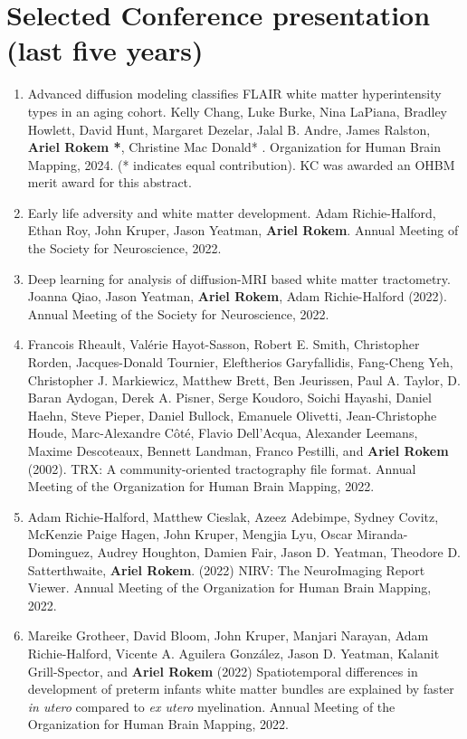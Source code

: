 \documentclass[11pt,fullpage]{article}
\begin{document}
\section*{Selected Conference presentation (last five years)}
\begin{enumerate}

\item Advanced diffusion modeling classifies FLAIR white matter hyperintensity types in an aging cohort. Kelly Chang, Luke Burke, Nina LaPiana, Bradley Howlett, David Hunt, Margaret
Dezelar, Jalal B. Andre, James Ralston, {\bf Ariel Rokem *}, Christine Mac Donald* . Organization for Human Brain Mapping, 2024. (* indicates equal contribution). KC was awarded an OHBM merit award for this abstract.

\item Early life adversity and white matter development. Adam Richie-Halford, Ethan Roy, John Kruper, Jason Yeatman, {\bf Ariel Rokem}. Annual Meeting of the Society for Neuroscience, 2022.

\item Deep learning for analysis of diffusion-MRI based white matter tractometry. Joanna Qiao, Jason Yeatman, {\bf Ariel Rokem}, Adam Richie-Halford (2022). Annual Meeting of the Society for Neuroscience, 2022.

\item Francois Rheault, Val\'{e}rie Hayot-Sasson, Robert E. Smith, Christopher Rorden, Jacques-Donald Tournier, Eleftherios Garyfallidis, Fang-Cheng Yeh, Christopher J. Markiewicz, Matthew Brett, Ben Jeurissen, Paul A. Taylor, D. Baran Aydogan, Derek A. Pisner, Serge Koudoro, Soichi Hayashi, Daniel Haehn, Steve Pieper, Daniel Bullock, Emanuele Olivetti, Jean-Christophe Houde, Marc-Alexandre C\^{o}t\'{e}, Flavio Dell’Acqua, Alexander Leemans, Maxime Descoteaux, Bennett Landman, Franco Pestilli, and {\bf Ariel Rokem} (2002). TRX: A community-oriented tractography file format. Annual Meeting of the Organization for Human Brain Mapping, 2022.

\item Adam Richie-Halford, Matthew Cieslak, Azeez Adebimpe, Sydney Covitz, McKenzie Paige Hagen, John Kruper, Mengjia Lyu, Oscar Miranda-Dominguez, Audrey Houghton, Damien Fair, Jason D. Yeatman, Theodore D. Satterthwaite, {\bf Ariel Rokem}. (2022) NIRV: The NeuroImaging Report Viewer. Annual Meeting of the Organization for Human Brain Mapping, 2022.

\item Mareike Grotheer, David Bloom, John Kruper, Manjari Narayan, Adam Richie-Halford, Vicente A. Aguilera González, Jason D. Yeatman, Kalanit Grill-Spector, and {\bf Ariel Rokem} (2022) Spatiotemporal differences in development of preterm infants white matter bundles are explained by faster \emph{in utero} compared to \emph{ex utero} myelination. Annual Meeting of the Organization for Human Brain Mapping, 2022.


\end{enumerate}
\end{document}

